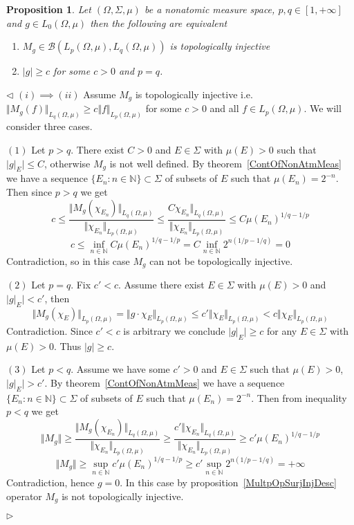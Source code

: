 \documentclass[12pt]{article}
\newtheorem{proposition}[theorem]{Proposition}
\newenvironment{proof}{\par $\triangleleft$}{$\triangleright$}
\begin{document}
\begin{proposition}\label{TopInjMultOpCharacOnNonAtomMeasSp} Let
    $(\Omega,\Sigma,\mu)$ be a nonatomic measure space, $p,q\in[1,+\infty]$ and
    $g\in L_0(\Omega,\mu)$ then the following are equivalent
    \begin{enumerate}[label = (\roman*)]
        \item $M_g\in\mathcal{B}(L_p(\Omega,\mu),L_q(\Omega,\mu))$ is
              topologically injective

        \item $|g|\geq c$ for some $c>0$ and $p=q$.
    \end{enumerate}
\end{proposition}
\begin{proof}
    $(i)\implies (ii)$ Assume $M_g$ is topologically injective i.e.
    $\Vert M_g(f)\Vert_{L_q(\Omega,\mu)}\geq c\Vert f\Vert_{L_p(\Omega,\mu)}$
    for some $c>0$ and all $f\in L_p(\Omega,\mu)$. We will consider three cases.

    $(1)$  Let $p>q$. There exist $C>0$ and $E\in\Sigma$ with $\mu(E)>0$ such
    that $|g|_E|\leq C$, otherwise $M_g$ is not well defined. By
    theorem~\ref{ContOfNonAtmMeas} we have a sequence
    $ \{E_n:n\in\mathbb{N} \}\subset\Sigma$ of subsets of $E$ such that
    $\mu(E_n)=2^{-n}$. Then since $p>q$ we get
    $$
        c \leq\frac{\Vert M_g(\chi_{E_n})\Vert_{L_q(\Omega,\mu)}}{\Vert
            \chi_{E_n}\Vert_{L_p(\Omega,\mu)}}
        \leq\frac{C\chi_{E_n}\Vert_{L_q(\Omega,\mu)}}{\Vert
            \chi_{E_n}\Vert_{L_p(\Omega,\mu)}} \leq C{\mu(E_n)}^{1/q-1/p}
    $$
    $$
        c \leq\inf_{n\in\mathbb{N}}C{\mu(E_n)}^{1/q-1/p} =C\inf_{n\in\mathbb{N}}
        2^{n(1/p-1/q)}=0
    $$
    Contradiction, so in this case $M_g$ can not be topologically injective.

    $(2)$ Let $p=q$. Fix $c'<c$. Assume there exist $E\in\Sigma$ with
    $\mu(E)>0$ and $|g|_{E}|<c'$, then
    $$
        \Vert M_g(\chi_{E})\Vert_{L_p(\Omega,\mu)} =\Vert g
        \cdot\chi_{E}\Vert_{L_p(\Omega,\mu)} \leq c' \Vert
        \chi_{E}\Vert_{L_p(\Omega,\mu)} <c\Vert \chi_{E}\Vert_{L_p(\Omega,\mu)}
    $$
    Contradiction. Since $c'<c$ is arbitrary we conclude $|g|_E|\geq c$ for any
    $E\in\Sigma$ with $\mu(E)>0$. Thus $|g|\geq c$.

    $(3)$ Let $p<q$. Assume we have some $c'>0$ and $E\in\Sigma$ such that
    $\mu(E)>0$, $|g|_E|>c'$. By theorem~\ref{ContOfNonAtmMeas} we have a
    sequence  $ \{E_n:n\in\mathbb{N} \}\subset\Sigma$ of subsets of $E$ such
    that $\mu(E_n)=2^{-n}$. Then from inequality $p<q$ we get
    $$
        \Vert M_g\Vert \geq\frac{\Vert
            M_g(\chi_{E_n})\Vert_{L_q(\Omega,\mu)}}{\Vert
            \chi_{E_n}\Vert_{L_p(\Omega,\mu)}}
        \geq\frac{c'\Vert\chi_{E_n}\Vert_{L_q(\Omega,\mu)}}{\Vert
            \chi_{E_n}\Vert_{L_p(\Omega,\mu)}} \geq c'{\mu(E_n)}^{1/q-1/p}
    $$
    $$
        \Vert M_g\Vert \geq\sup_{n\in\mathbb{N}}c'{\mu(E_n)}^{1/q-1/p} \geq
        c'\sup_{n\in\mathbb{N}}2^{n(1/p-1/q)} =+\infty
    $$
    Contradiction, hence $g=0$. In this case by
    proposition~\ref{MultpOpSurjInjDesc} operator $M_g$ is not topologically
    injective.


\end{proof}
\end{document}
